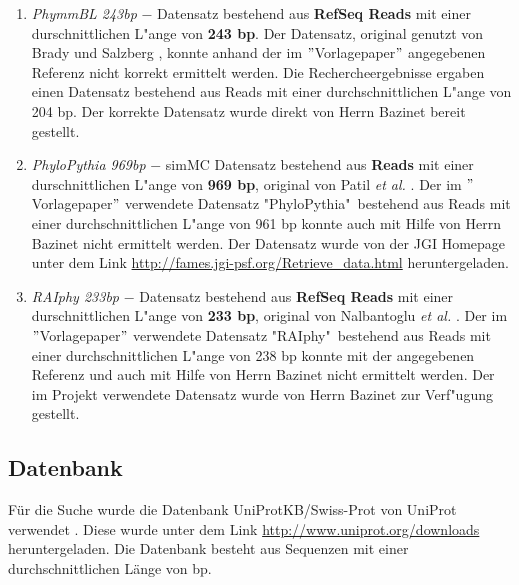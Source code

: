 \documentclass[10pt, a4paper]{report}[08.12.2015]
\begin{document}
\begin{enumerate}
          \item \textit{PhymmBL 243bp} $-$ Datensatz bestehend aus 
          \textbf{ RefSeq
          Reads} mit einer durschnittlichen L"ange von
          \textbf{243 bp}. Der Datensatz, original genutzt von Brady und 
          Salzberg \cite{bradysalzberg2009},  
          konnte anhand der im $"$Vorlagepaper$"$ angegebenen Referenz nicht 
          korrekt ermittelt werden. Die Rechercheergebnisse
          ergaben einen Datensatz bestehend aus  Reads mit einer 
          durchschnittlichen L"ange von 204 bp. Der korrekte
          Datensatz wurde direkt von Herrn
          Bazinet bereit gestellt.  
          
          \item \textit{PhyloPythia 969bp} $-$ simMC Datensatz bestehend aus
          \textbf{ Reads} mit einer durschnittlichen L"ange von
          \textbf{969 bp}, original von Patil \textit{et al.} 							  \cite{patil2011}. Der im $"$Vorlagepaper$"$ verwendete Datensatz 
          "PhyloPythia"\ bestehend aus  Reads mit einer 
          durchschnittlichen L"ange von 961 bp konnte
          auch mit Hilfe von Herrn Bazinet nicht ermittelt werden.
          Der Datensatz wurde von der JGI Homepage unter dem Link
          \url{http://fames.jgi-psf.org/Retrieve_data.html} heruntergeladen.  
          
          \item \textit{RAIphy 233bp} $-$ Datensatz bestehend aus
          \textbf{ RefSeq Reads} mit einer durschnittlichen L"ange von
          \textbf{233 bp}, original von Nalbantoglu \textit{et al.} 					  \cite{nalbantoglu2011}. Der im $"$Vorlagepaper$"$ verwendete 					  Datensatz "RAIphy"\ bestehend aus  Reads mit einer 
          durchschnittlichen L"ange von 238 bp konnte
          mit der angegebenen Referenz und auch mit Hilfe von Herrn Bazinet 			  nicht ermittelt werden. Der im Projekt verwendete Datensatz wurde 			  von Herrn Bazinet zur Verf"ugung gestellt.
          
        \end{enumerate}
        
      \subsection{Datenbank}
      F\"ur die Suche wurde die Datenbank UniProtKB/Swiss-Prot von UniProt 			  verwendet \cite{bairoch2004}.
      Diese wurde unter dem Link \url{http://www.uniprot.org/downloads}
      heruntergeladen.
      Die Datenbank besteht aus  Sequenzen mit einer 						  durchschnittlichen L\"ange von bp.
\end{document}
